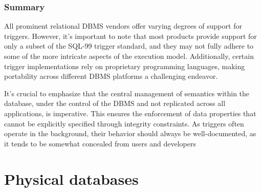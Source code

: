 \documentclass[12pt, a4paper]{report}
\begin{document}
    \subsection{Summary}
    All prominent relational DBMS vendors offer varying degrees of support for triggers. 
    However, it's important to note that most products provide support for only a subset of the SQL-99 trigger standard, and they may not fully adhere to some of the more intricate aspects of the execution model. 
    Additionally, certain trigger implementations rely on proprietary programming languages, making portability across different DBMS platforms a challenging endeavor.
    
    It's crucial to emphasize that the central management of semantics within the database, under the control of the DBMS and not replicated across all applications, is imperative. 
    This ensures the enforcement of data properties that cannot be explicitly specified through integrity constraints. 
    As triggers often operate in the background, their behavior should always be well-documented, as it tends to be somewhat concealed from users and developers

    \newpage

    \chapter{Physical databases}



    
\end{document}
